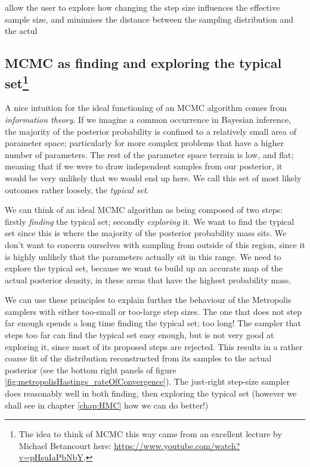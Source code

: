 \documentclass[11pt,fullpage]{book}
\begin{document}
 allow the user to explore how changing the step size influences the effective sample size, and minimises the distance between the sampling distribution and the actul

\subsection{MCMC as finding and exploring the typical set\footnote{The idea to think of MCMC this way came from an excellent lecture by Michael Betancourt here: \url{https://www.youtube.com/watch?v=pHsuIaPbNbY}.}}
A nice intuition for the ideal functioning of an MCMC algorithm comes from \textit{information theory}. If we imagine a common occurrence in Bayesian inference, the majority of the posterior probability is confined to a relatively small area of parameter space; particularly for more complex problems that have a higher number of parameters. The rest of the parameter space terrain is low, and flat; meaning that if we were to draw independent samples from our posterior, it would be very unlikely that we would end up here. We call this set of most likely outcomes rather loosely, the \textit{typical set}.

We can think of an ideal MCMC algorithm as being composed of two steps: firstly \textit{finding} the typical set; secondly \textit{exploring} it. We want to find the typical set since this is where the majority of the posterior probability mass sits. We don't want to concern ourselves with sampling from outside of this region, since it is highly unlikely that the parameters actually sit in this range. We need to explore the typical set, because we want to build up an accurate map of the actual posterior density, in these areas that have the highest probability mass. 

We can use these principles to explain further the behaviour of the Metropolis samplers with either too-small or too-large step sizes. The one that does not step far enough spends a long time finding the typical set; too long! The sampler that steps too far can find the typical set easy enough, but is not very good at exploring it, since most of its proposed steps are rejected. This results in a rather coarse fit of the distribution reconstructed from its samples to the actual posterior (see the bottom right panels of figure \ref{fig:metropolisHastings_rateOfConvergence}). The just-right step-size sampler does reasonably well in both finding, then exploring the typical set (however we shall see in chapter \ref{chap:HMC} how we can do better!)
\end{document}
